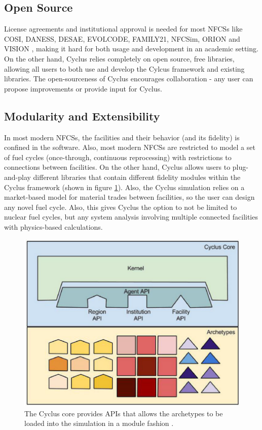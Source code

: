 \subsection{Open Source}
License agreements and institutional
approval is needed for most \glspl{NFCS} like COSI, DANESS, DESAE, EVOLCODE,
FAMILY21, NFCSim, ORION and VISION \cite{jacobson_verifiable_2010}, making
it hard for both usage and development in an academic setting.
On the other hand, Cyclus relies completely on open source,
free libraries, allowing all users to both use and develop the
Cylcus framework and existing libraries. The open-sourceness
of Cyclus encourages collaboration - any user can propose
improvements or provide input for Cyclus.

\subsection{Modularity and Extensibility}
In most modern \glspl{NFCS}, the facilities and their
behavior (and its fidelity) is confined in the software.
Also, most modern \glspl{NFCS} are restricted to model
a set of fuel cycles (once-through, continuous reprocessing)
with restrictions to connections between facilities. On the
other hand, Cyclus allows users to plug-and-play different libraries
that contain different fidelity modules within the Cyclus framework
(shown in figure \ref{fig:core}).
Also, the Cyclus simulation relies on a market-based model
for material trades between facilities, so the user can design
any novel fuel cycle. Also, this gives Cyclus the option to not
be limited to nuclear fuel cycles, but any system analysis
involving multiple connected facilities with physics-based
calculations.


\begin{figure}[htbp!]
	\begin{center}
		\includegraphics[scale=0.2]{./images/cyclus_core.png}
	\end{center}
	\caption{The Cyclus core provides APIs that allows the archetypes
			to be loaded into the simulation in a module fashion
			\cite{huff_fundamental_2016}.}
	\label{fig:core}
\end{figure}

